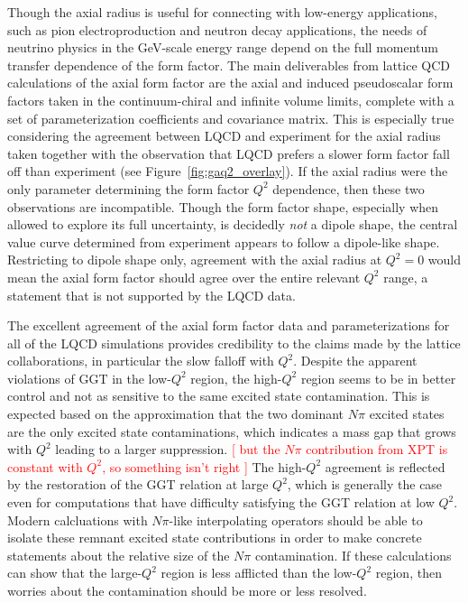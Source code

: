 Though the axial radius is useful for connecting with low-energy applications,
 such as pion electroproduction and neutron decay applications,
 the needs of neutrino physics in the GeV-scale energy range depend
 on the full momentum transfer dependence of the form factor.
The main deliverables from lattice QCD calculations of the axial form factor
 are the axial and induced pseudoscalar form factors taken in the continuum-chiral
 and infinite volume limits, complete with a set of parameterization coefficients
 and covariance matrix.
This is especially true considering the agreement between LQCD and experiment
 for the axial radius taken together with the observation that
 LQCD prefers a slower form factor fall off than experiment (see Figure~\ref{fig:gaq2_overlay}).
If the axial radius were the only parameter determining the form factor $Q^2$ dependence,
 then these two observations are incompatible.
 Though the form factor shape, especially when allowed to explore its full uncertainty,
 is decidedly \emph{not} a dipole shape, the central value curve determined
 from experiment appears to follow a dipole-like shape.
Restricting to dipole shape only, agreement with the axial radius at $Q^2=0$
 would mean the axial form factor should agree over the entire relevant $Q^2$ range,
 a statement that is not supported by the LQCD data.

The excellent agreement of the axial form factor data and parameterizations
 for all of the LQCD simulations provides credibility to the claims
 made by the lattice collaborations, in particular the slow falloff with $Q^2$.
Despite the apparent violations of GGT in the low-$Q^2$ region,
 the high-$Q^2$ region seems to be in better control and not as sensitive to
 the same excited state contamination.
This is expected based on the approximation that the
 two dominant $N\pi$ excited states are the only excited state contaminations,
 which indicates a mass gap that grows with $Q^2$ leading to a larger suppression.
\textcolor{red}{[ but the $N\pi$ contribution from XPT is constant with $Q^2$,
 so something isn't right ]}
The high-$Q^2$ agreement is reflected by the restoration of the GGT relation at large $Q^2$,
 which is generally the case even for computations that have difficulty satisfying
 the GGT relation at low $Q^2$.
Modern calcluations with $N\pi$-like interpolating operators should be able
 to isolate these remnant excited state contributions in order to make
 concrete statements about the relative size of the $N\pi$ contamination.
If these calculations can show that the large-$Q^2$ region is less afflicted
 than the low-$Q^2$ region, then worries about the contamination should be more or less resolved.

